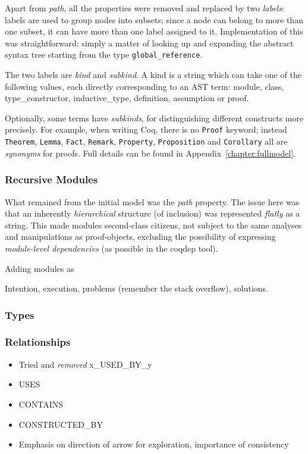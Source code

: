 Apart from \emph{path}, all the properties were removed and replaced by two
\emph{labels}: labels are used to group  nodes into subsets; since a node can
belong to more than one subset, it can have more than one label assigned to it.
Implementation of this was straightforward: simply a matter of looking up and
expanding the abstract syntax tree starting from the type
\texttt{global\_reference}.

The two labels are \emph{kind} and \emph{subkind}.  A kind is a string which can
take one of the following values, each directly corresponding to an AST term:
\textsf{module}, \textsf{class}, \textsf{type\_constructor},
\textsf{inductive\_type}, \textsf{definition}, \textsf{assumption} or
\textsf{proof}.

Optionally, some terms have \emph{subkinds}, for distinguishing different
constructs more precisely. For example, when writing Coq, there is no
\texttt{Proof} keyword; instead \texttt{Theorem}, \texttt{Lemma}, \texttt{Fact},
\texttt{Remark}, \texttt{Property}, \texttt{Proposition} and \texttt{Corollary}
all are \emph{synonyms} for proofs. Full details can be found in
Appendix~\ref{chapter:fullmodel}.

\subsubsection{Recursive Modules}

What remained from the initial model was the \emph{path} property. The issue
here was that an inherently \emph{hierarchical} structure (of inclusion) was
represented \emph{flatly} as a string. This made modules second-class citizens,
not subject to the same analyses and manipulations as proof-objects, excluding
the possibility of expressing \emph{module-level dependencies} (as possible
in the coqdep tool).

Adding modules as 

Intention, execution, problems (remember the stack overflow), solutions.

\subsubsection{Types}

\subsubsection{Relationships}

\begin{itemize}
  \item Tried and \emph{removed} x\_USED\_BY\_y
  \item USES
  \item CONTAINS
  \item CONSTRUCTED\_BY
  \item Emphasis on direction of arrow for exploration, importance of consistency
\end{itemize}

